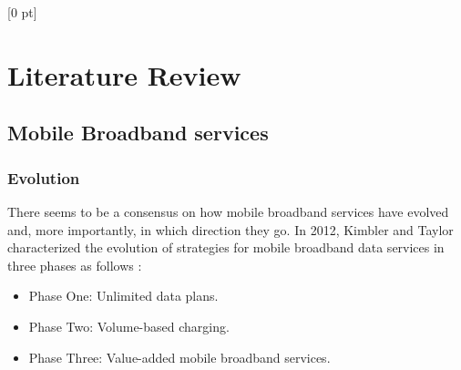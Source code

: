 \titlespacing{\chapter}{0 pt}{30 pt}{50 pt}[0 pt]
\titleformat{\section}{\Large\bfseries}{\thesection}{0 pt}{\hspace{30 pt}}
\titleformat{\subsection}{\large\bfseries}{\thesubsection}{0 pt}{\hspace{30 pt}}
\pagestyle{fancy}
\renewcommand{\chaptername}{CHAPTER}
\fancyhead[LO,LE]{\footnotesize\textit{\leftmark}}
\fancyhead[RO,RE]{\thepage}
\fancyfoot[CO,CE]{}

\chapter{Literature Review} 

\normalsize

\section{Mobile Broadband services}
\noindent

\subsection{Evolution}
\noindent
There seems to be a consensus on how mobile broadband services have evolved and, more importantly, in which direction they go. In 2012, Kimbler and Taylor characterized the evolution of strategies for mobile broadband data services in three phases as follows \cite{Kimbler2012}:
  \begin{itemize}
      \item Phase One: Unlimited data plans.
      \item Phase Two: Volume-based charging.
      \item Phase Three: Value-added mobile broadband services.
    \end{itemize} \bigskip

